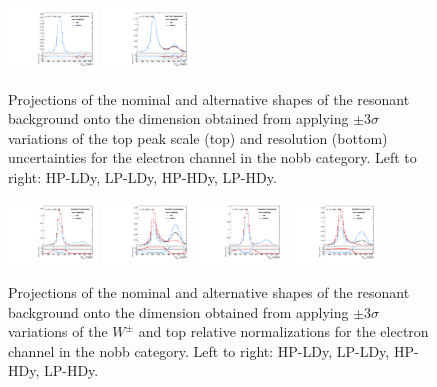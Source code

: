 \begin{figure}[htbp]
  \includegraphics[width=0.21\textwidth]{fig/uncertainties/systs_res_e_HP_nobb_HDy_resTopY_ProjY.pdf}
  \includegraphics[width=0.21\textwidth]{fig/uncertainties/systs_res_e_LP_nobb_HDy_resTopY_ProjY.pdf}\\
  \caption{
    Projections of the nominal and alternative shapes of the resonant background onto the \MJ dimension obtained from applying $\pm3\sigma$ variations of the top peak scale (top) and resolution (bottom) uncertainties for the electron channel in the nobb category.
    Left to right: HP-LDy, LP-LDy, HP-HDy, LP-HDy.
  }
  \label{fig:systResMJ_scaleTopY_resTopY}
\end{figure}

\begin{figure}[htbp]
  \centering
  \includegraphics[width=0.21\textwidth]{fig/uncertainties/systs_res_e_HP_nobb_LDy_fractionY_ProjY.pdf}
  \includegraphics[width=0.21\textwidth]{fig/uncertainties/systs_res_e_LP_nobb_LDy_fractionY_ProjY.pdf}
  \includegraphics[width=0.21\textwidth]{fig/uncertainties/systs_res_e_HP_nobb_HDy_fractionY_ProjY.pdf}
  \includegraphics[width=0.21\textwidth]{fig/uncertainties/systs_res_e_LP_nobb_HDy_fractionY_ProjY.pdf}\\
  \caption{
    Projections of the nominal and alternative shapes of the resonant background onto the \MJ dimension obtained from applying $\pm3\sigma$ variations of the $W^\pm$ and top relative normalizations for the electron channel in the nobb category.
    Left to right: HP-LDy, LP-LDy, HP-HDy, LP-HDy.
  }
  \label{fig:systResMJ_fractionY}
\end{figure}
